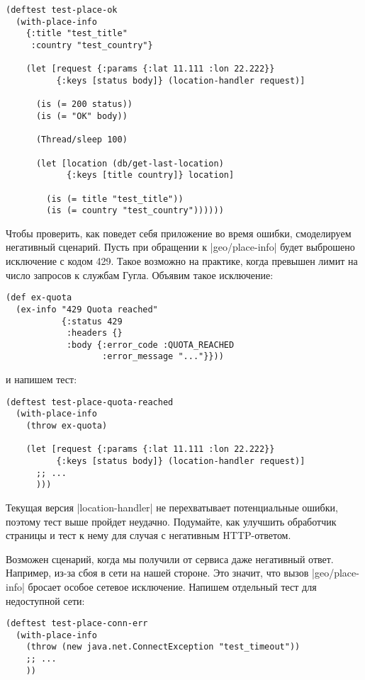 {{{{{{{{\begin{verbatim}
(deftest test-place-ok
  (with-place-info
    {:title "test_title"
     :country "test_country"}

    (let [request {:params {:lat 11.111 :lon 22.222}}
          {:keys [status body]} (location-handler request)]

      (is (= 200 status))
      (is (= "OK" body))

      (Thread/sleep 100)

      (let [location (db/get-last-location)
            {:keys [title country]} location]

        (is (= title "test_title"))
        (is (= country "test_country"))))))
\end{verbatim}

Чтобы проверить, как поведет себя приложение во время ошибки, смоделируем
негативный сценарий. Пусть при обращении к \spverb|geo/place-info| будет выброшено
исключение с кодом 429. Такое возможно на практике, когда превышен лимит на
число запросов к службам Гугла. Объявим такое исключение:

\begin{verbatim}
(def ex-quota
  (ex-info "429 Quota reached"
           {:status 429
            :headers {}
            :body {:error_code :QUOTA_REACHED
                   :error_message "..."}}))
\end{verbatim}

и напишем тест:

\begin{verbatim}
(deftest test-place-quota-reached
  (with-place-info
    (throw ex-quota)

    (let [request {:params {:lat 11.111 :lon 22.222}}
          {:keys [status body]} (location-handler request)]
      ;; ...
      )))
\end{verbatim}

Текущая версия \spverb|location-handler| не перехватывает потенциальные ошибки, поэтому
тест выше пройдет неудачно. Подумайте, как улучшить обработчик страницы и тест к
нему для случая с негативным HTTP-ответом.

Возможен сценарий, когда мы получили от сервиса даже негативный ответ. Например,
из-за сбоя в сети на нашей стороне. Это значит, что вызов \spverb|geo/place-info|
бросает особое сетевое исключение. Напишем отдельный тест для недоступной сети:

\begin{verbatim}
(deftest test-place-conn-err
  (with-place-info
    (throw (new java.net.ConnectException "test_timeout"))
    ;; ...
    ))
\end{verbatim}

}}}}}}}}
